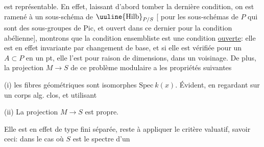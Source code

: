 est représentable. En effet, laissant d'abord
tomber la dernière condition, on est
ramené à un sous-schéma  de
$\uuline{\mathrm{Hilb}}_{P/S}$ [ pour les sous-schémas de $P$
qui sont des sous-groupes de $\mathrm{Pic}$, et
ouvert dans ce dernier pour la condition
abélienne], montrons que la condition
ensembliste est une condition\unsure{,|\,} \uline{ouverte}:
elle est en effet invariante par changement
de base, et si elle est
vérifiée pour un $A\subset P$ en un pt,
elle l'est pour raison de dimensions,
dans un voisinage. De plus,
la projection $M\to S$ de ce problème
modulaire a les propriétés suivantes

(i) les fibres géométriques sont isomorphes 
 $\mathrm{Spec}\ k(x)$. Évident, en regardant
sur un corps alg. clos, et utilisant 

(ii) La projection $M\to S$ est propre.

Elle est en effet de type fini\unsure{;|,} séparée, reste
à appliquer le critère valuatif, savoir
ceci: dans le cas où $S$ est le spectre d'un
